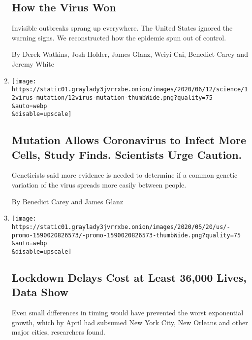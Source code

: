 \begin{enumerate}
  \hypertarget{how-the-virus-won}{%
  \subsection{How the Virus Won}\label{how-the-virus-won}}

  Invisible outbreaks sprang up everywhere. The United States ignored
  the warning signs. We reconstructed how the epidemic spun out of
  control.

  By Derek Watkins, Josh Holder, James Glanz, Weiyi Cai, Benedict Carey
  and Jeremy White
\item
  \href{/2020/06/12/science/coronavirus-mutation-genetics-spike.html}{}

  \texttt{[image: https://static01.graylady3jvrrxbe.onion/images/2020/06/12/science/12virus-mutation/12virus-mutation-thumbWide.png?quality=75\\\&auto=webp\\\&disable=upscale]}

  \hypertarget{mutation-allows-coronavirus-to-infect-more-cells-study-finds-scientists-urge-caution}{%
  \subsection{Mutation Allows Coronavirus to Infect More Cells, Study
  Finds. Scientists Urge
  Caution.}\label{mutation-allows-coronavirus-to-infect-more-cells-study-finds-scientists-urge-caution}}

  Geneticists said more evidence is needed to determine if a common
  genetic variation of the virus spreads more easily between people.

  By Benedict Carey and James Glanz
\item
  \href{/2020/05/20/us/coronavirus-distancing-deaths.html}{}

  \texttt{[image: https://static01.graylady3jvrrxbe.onion/images/2020/05/20/us/-promo-1590020826573/-promo-1590020826573-thumbWide.png?quality=75\\\&auto=webp\\\&disable=upscale]}

  \hypertarget{lockdown-delays-cost-at-least-36000-lives-data-show}{%
  \subsection{Lockdown Delays Cost at Least 36,000 Lives, Data
  Show}\label{lockdown-delays-cost-at-least-36000-lives-data-show}}

  Even small differences in timing would have prevented the worst
  exponential growth, which by April had subsumed New York City, New
  Orleans and other major cities, researchers found.


\end{enumerate}
